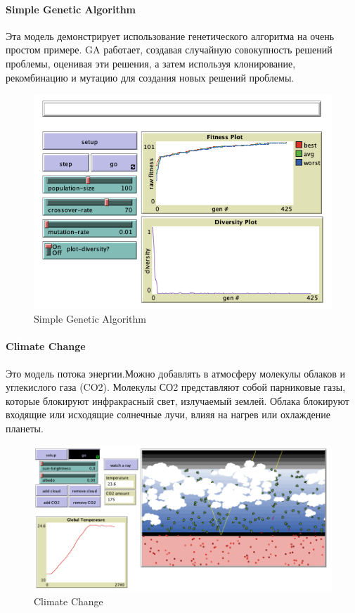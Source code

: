 \documentclass[14pt,a4paper,report]{report}
\begin{document}
\paragraph{Simple Genetic Algorithm}

Эта модель демонстрирует использование генетического алгоритма на очень простом примере. GA работает, создавая случайную совокупность решений проблемы, оценивая эти решения, а затем используя клонирование, рекомбинацию и мутацию для создания новых решений проблемы.

\begin{figure}[h!]
	\centering
	\includegraphics[scale = 0.49]{images/10.png}
	\caption{Simple Genetic Algorithm}
\end{figure}

\clearpage

\paragraph{Climate Change}
Это модель потока энергии.Можно добавлять в атмосферу молекулы облаков и углекислого газа (CO2). Молекулы СО2 представляют собой парниковые газы, которые блокируют инфракрасный свет, излучаемый землей. Облака блокируют входящие или исходящие солнечные лучи, влияя на нагрев или охлаждение планеты.


\begin{figure}[h!]
	\centering
	\includegraphics[scale = 0.49]{images/11.png}
	\caption{Climate Change}
\end{figure}
\end{document}
